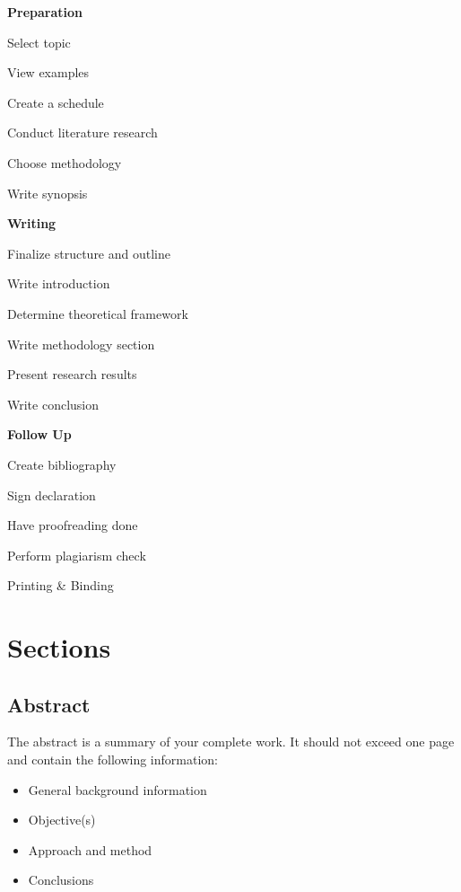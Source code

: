 \documentclass[a4paper,11pt,fleqn]{book}
\begin{document}
\begin{multicols}{3}
  \textbf{Preparation}
  \begin{todolist}[noitemsep]
    \item[\cmark] Select topic
    \item[\cmark] View examples
    \item[\cmark] Create a schedule
    \item[\cmark] Conduct literature research
    \item[\cmark] Choose methodology
    \item[\cmark] Write synopsis
  \end{todolist}

  \vfill\null\columnbreak
  \textbf{Writing}
  \begin{todolist}[noitemsep]
    \item[\cmark] Finalize structure and outline
    \item[\cmark] Write introduction
    \item[\cmark] Determine theoretical framework
    \item[\cmark] Write methodology section
    \item[\cmark] Present research results
    \item[\cmark] Write conclusion
  \end{todolist}

  \vfill\null\columnbreak
  \textbf{Follow Up}
  \begin{todolist}[noitemsep]
    \item[\cmark] Create bibliography
    \item[\cmark] Sign declaration
    \item[\cmark] Have proofreading done
    \item[\cmark] Perform plagiarism check
    \item[\cmark] Printing & Binding
  \end{todolist}
\end{multicols}

\section{Sections}
\subsection{Abstract}
The abstract is a summary of your complete work. It should not exceed one page and contain the following information:
\begin{itemize}
  \item General background information
  \item Objective(s)
  \item Approach and method
  \item Conclusions
\end{itemize}
\end{document}
